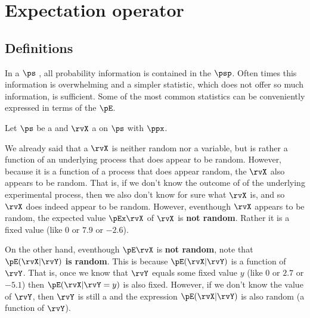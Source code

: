 \chapter{Expectation operator}
\label{chp:stats}
\section{Definitions}
In a  $\ps$ , all probability information
is contained in the  $\psp$.
Often times this information is overwhelming and a simpler statistic,
which does not offer so much information, is sufficient.
Some of the most common statistics can be conveniently expressed in terms
of the  $\pE$.
\begin{definition}
\label{def:pE}
Let $\ps$ be a   and
$\rvX$ a   on $\ps$ with
 $\ppx$.
\end{definition}

We already said that a  $\rvX$ is neither random nor a variable,
but is rather a function of an underlying process that does appear to be random.
However, because it is a function of a process that does appear random,
the  $\rvX$ also appears to be random.
That is, if we don't know the outcome of of the underlying experimental
process, then we also don't know for sure what $\rvX$ is, and so $\rvX$ does
indeed appear to be random.
However, eventhough $\rvX$ appears to be random,
the expected value $\pEx\rvX$  of $\rvX$ is {\bf not random}.
Rather it is a fixed value (like $0$ or $7.9$ or $-2.6$).

On the other hand, eventhough $\pE\rvX$ is {\bf not random},
note that $\pE(\rvX|\rvY)$ {\bf is random}.
This is because $\pE(\rvX|\rvY)$ is a function of $\rvY$.
That is, once we know that $\rvY$ equals some fixed value $y$
(like $0$ or $2.7$ or $-5.1$) then $\pE(\rvX|\rvY=y)$ is also fixed.
However, if we don't know the value of $\rvY$,
then $\rvY$ is still a  and the expression $\pE(\rvX|\rvY)$
is also random (a function of  $\rvY$).

